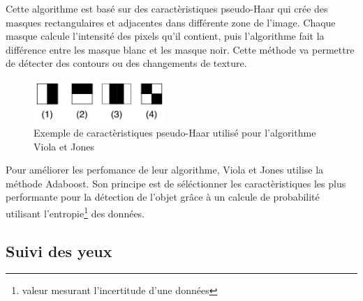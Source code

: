 Cette algorithme est basé sur des caractèristiques pseudo-Haar qui crée des masques rectangulaires et adjacentes
dans différente zone de l'image. Chaque masque calcule l'intensité des pixels qu'il contient, puis l'algorithme fait
la différence entre les masque blanc et les masque noir. Cette méthode va permettre de détecter des contours ou des changements de 
texture.\\

\begin{figure}[H]
\center
\includegraphics[width=5cm]{image/pseudo_haar.png}
\caption{Exemple de caractèristiques pseudo-Haar utilisé pour l'algorithme Viola et Jones}
\end{figure}

Pour améliorer les perfomance de leur algorithme, Viola et Jones utilise la méthode Adaboost. Son
principe est de séléctionner les caractèristiques les plus performante pour la détection de l'objet grâce à
un calcule de probabilité utilisant l'entropie\footnote{valeur mesurant l'incertitude d'une données} des données.

\subsection{Suivi des yeux}



